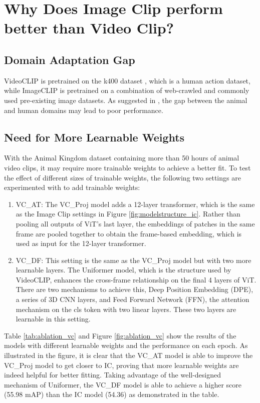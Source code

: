 \section{Why Does Image Clip perform better than Video Clip?}
\label{sec:ablation_vc}
\subsection{Domain Adaptation Gap}
VideoCLIP is pretrained on the k400 dataset \parencite{kay2017kinetics}, which is a human action dataset, while ImageCLIP is pretrained on a combination of web-crawled and commonly used pre-existing image datasets. As suggested in \parencite{farahani2021brief}, the gap between the animal and human domains may lead to poor performance.

\subsection{Need for More Learnable Weights}
With the Animal Kingdom dataset containing more than 50 hours of animal video clips, it may require more trainable weights to achieve a better fit. To test the effect of different sizes of trainable weights, the following two settings are experimented with to add trainable weights:

\begin{enumerate}
    \item VC\_AT: The VC\_Proj model adds a 12-layer transformer, which is the same as the Image Clip settings in Figure \ref{fig:modelstructure_ic}. Rather than pooling all outputs of ViT's last layer, the embeddings of patches in the same frame are pooled together to obtain the frame-based embedding, which is used as input for the 12-layer transformer.
    \item VC\_DF: This setting is the same as the VC\_Proj model but with two more learnable layers. The Uniformer model, which is the structure used by VideoCLIP, enhances the cross-frame relationship on the final 4 layers of ViT. There are two mechanisms to achieve this, Deep Position Embedding (DPE), a series of 3D CNN layers, and Feed Forward Network (FFN), the attention mechanism on the cls token with two linear layers. These two layers are learnable in this setting.
\end{enumerate}

Table \ref{tab:ablation_vc} and Figure \ref{fig:ablation_vc} show the results of the models with different learnable weights and the performance on each epoch. As illustrated in the figure, it is clear that the VC\_AT model is able to improve the VC\_Proj model to get closer to IC, proving that more learnable weights are indeed helpful for better fitting. Taking advantage of the well-designed mechanism of Uniformer, the VC\_DF model is able to achieve a higher score (55.98 mAP) than the IC model (54.36) as demonstrated in the table. 

